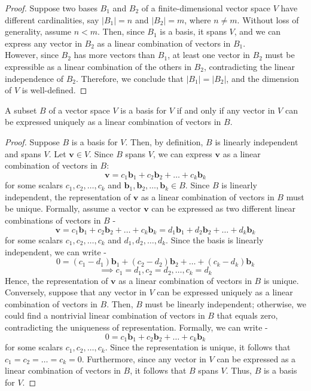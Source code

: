 \documentclass[openany]{book}
\begin{document}
\begin{proof}
    Suppose two bases $B_1$ and $B_2$ of a finite-dimensional vector space $V$ have different cardinalities, say $\lvert B_1 \rvert = n$ and $\lvert B_2 \rvert = m$, where $n \neq m$. Without loss of generality, assume $n < m$. Then, since $B_1$ is a basis, it spans $V$, and we can express any vector in $B_2$ as a linear combination of vectors in $B_1$. \\
    However, since $B_2$ has more vectors than $B_1$, at least one vector in $B_2$ must be expressible as a linear combination of the others in $B_2$, contradicting the linear independence of $B_2$. Therefore, we conclude that $\lvert B_1 \rvert = \lvert B_2 \rvert$, and the dimension of $V$ is well-defined.
\end{proof}
\begin{mytheorem}
    A subset $B$ of a vector space $V$ is a basis for $V$ if and only if any vector in $V$ can be expressed uniquely as a linear combination of vectors in $B$.
\end{mytheorem}
\begin{proof}
    Suppose $B$ is a basis for $V$. Then, by definition, $B$ is linearly independent and spans $V$. Let $\mathbf{v} \in V$. Since $B$ spans $V$, we can express $\mathbf{v}$ as a linear combination of vectors in $B$:
    $$\mathbf{v} = c_1 \mathbf{b}_1 + c_2 \mathbf{b}_2 + \ldots + c_k \mathbf{b}_k$$
    for some scalars $c_1, c_2, \ldots, c_k$ and $\mathbf{b}_1, \mathbf{b}_2, \ldots, \mathbf{b}_k \in B$. Since $B$ is linearly independent, the representation of $\mathbf{v}$ as a linear combination of vectors in $B$ must be unique. Formally, assume a vector $\mathbf{v}$ can be expressed as two different linear combinations of vectors in $B$ - 
    $$\mathbf{v} = c_1 \mathbf{b}_1 + c_2 \mathbf{b}_2 + \ldots + c_k \mathbf{b}_k = d_1 \mathbf{b}_1 + d_2 \mathbf{b}_2 + \ldots + d_k \mathbf{b}_k$$
    for some scalars $c_1, c_2, \ldots, c_k$ and $d_1, d_2, \ldots, d_k$. Since the basis is linearly independent, we can write -
    $$0 = (c_1 - d_1) \mathbf{b}_1 + (c_2 - d_2) \mathbf{b}_2 + \ldots + (c_k - d_k) \mathbf{b}_k$$
    $$\implies c_1 = d_1, c_2 = d_2, \ldots, c_k = d_k$$
    Hence, the representation of $\mathbf{v}$ as a linear combination of vectors in $B$ is unique. \\ 
    Conversely, suppose that any vector in $V$ can be expressed uniquely as a linear combination of vectors in $B$. Then, $B$ must be linearly independent; otherwise, we could find a nontrivial linear combination of vectors in $B$ that equals zero, contradicting the uniqueness of representation. Formally, we can write -
    $$0 = c_1 \mathbf{b}_1 + c_2 \mathbf{b}_2 + \ldots + c_k \mathbf{b}_k$$
    for some scalars $c_1, c_2, \ldots, c_k$. Since the representation is unique, it follows that $c_1 = c_2 = \ldots = c_k = 0$. Furthermore, since any vector in $V$ can be expressed as a linear combination of vectors in $B$, it follows that $B$ spans $V$. Thus, $B$ is a basis for $V$.
\end{proof}
\end{document}

